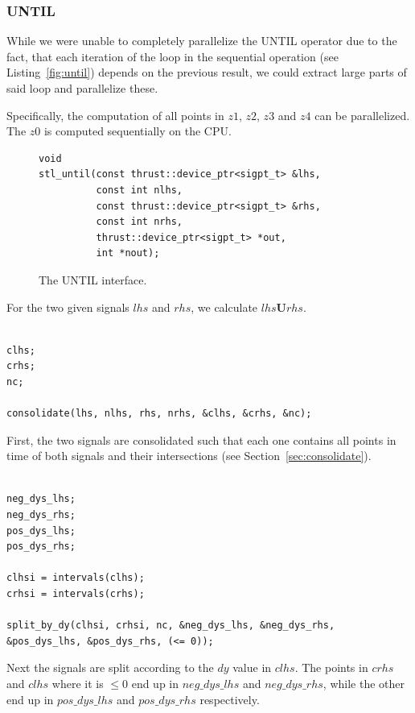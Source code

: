\documentclass[a4paper,10pt]{article}
\newcommand{\Until}{\mathbf{U}}
\begin{document}
\subsubsection{UNTIL}

While we were unable to completely parallelize the UNTIL operator due to the fact,
that each iteration of the loop in the sequential operation (see
Listing~\ref{fig:until}) depends on the previous result, we could extract large parts
of said loop and parallelize these.

Specifically, the computation of all points in $z1$, $z2$, $z3$ and $z4$ can be
parallelized. The $z0$ is computed sequentially on the CPU.

\begin{figure}[H]
\begin{lstlisting}
void
stl_until(const thrust::device_ptr<sigpt_t> &lhs,
          const int nlhs,
          const thrust::device_ptr<sigpt_t> &rhs,
          const int nrhs,
          thrust::device_ptr<sigpt_t> *out,
          int *nout);
\end{lstlisting}
\caption{
\label{fig:parallel_until}
The UNTIL interface.}
\end{figure}

For the two given signals $lhs$ and $rhs$, we calculate $lhs \Until rhs$.

\begin{lstlisting}

clhs;
crhs;
nc;

consolidate(lhs, nlhs, rhs, nrhs, &clhs, &crhs, &nc);

\end{lstlisting}

First, the two signals are consolidated such that each one contains all points in
time of both signals and their intersections (see Section~\ref{sec:consolidate}).

\begin{lstlisting}

neg_dys_lhs;
neg_dys_rhs;
pos_dys_lhs;
pos_dys_rhs;

clhsi = intervals(clhs);
crhsi = intervals(crhs);

split_by_dy(clhsi, crhsi, nc, &neg_dys_lhs, &neg_dys_rhs, &pos_dys_lhs, &pos_dys_rhs, (<= 0));

\end{lstlisting}

Next the signals are split according to the $dy$ value in $clhs$. The points in
$crhs$ and $clhs$ where it is $\leq 0$ end up in $neg\_dys\_lhs$ and $neg\_dys\_rhs$,
while the other end up in $pos\_dys\_lhs$ and $pos\_dys\_rhs$ respectively.
\end{document}
